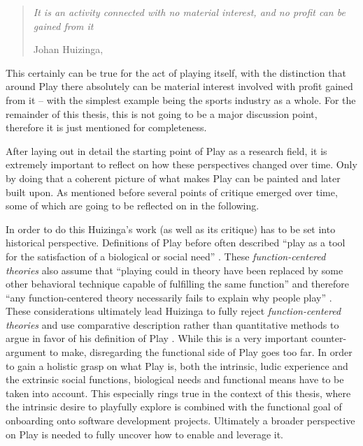 \begin{quote}
  \textit{It is an activity connected with no material interest, and no profit can be gained from it}

  \footnotesize{Johan Huizinga, \cite[p. 13]{huizinga2020homo}}
\end{quote}

This certainly can be true for the act of playing itself, with the distinction that around Play there absolutely can be material interest involved with profit gained from it -- with the simplest example being the sports industry as a whole. For the remainder of this thesis, this is not going to be a major discussion point, therefore it is just mentioned for completeness.

After laying out in detail the starting point of Play as a research field, it is extremely important to reflect on how these perspectives changed over time. Only by doing that a coherent picture of what makes Play can be painted and later built upon. As mentioned before several points of critique emerged over time, some of which are going to be reflected on in the following.

In order to do this Huizinga's work (as well as its critique) has to be set into historical perspective. Definitions of Play before often described \enquote{play as a tool for the satisfaction of a biological or social need} \cite{rodriguez2006playful}. These \textit{function-centered theories} also assume that \enquote{playing could in theory have been replaced by some other behavioral technique capable of fulfilling the same function} \cite{rodriguez2006playful} and therefore \enquote{any function-centered theory necessarily fails to explain why people play} \cite{rodriguez2006playful}. These considerations ultimately lead Huizinga to fully reject \textit{function-centered theories} and use comparative description rather than quantitative methods to argue in favor of his definition of Play \cite{rodriguez2006playful}. While this is a very important counter-argument to make, disregarding the functional side of Play goes too far. In order to gain a holistic grasp on what Play is, both the intrinsic, ludic experience and the extrinsic social functions, biological needs and functional means have to be taken into account. This especially rings true in the context of this thesis, where the intrinsic desire to playfully explore is combined with the functional goal of onboarding onto software development projects. Ultimately a broader perspective on Play is needed to fully uncover how to enable and leverage it.

